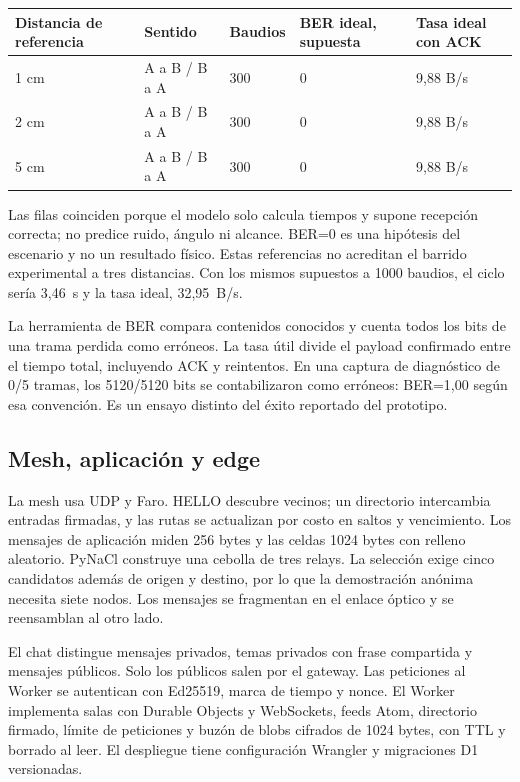 \documentclass[11pt,letterpaper]{article}
\begin{document}
{\small
\begin{tabularx}{\linewidth}{l l l X X}
\toprule
Distancia de referencia & Sentido & Baudios & BER ideal, supuesta & Tasa ideal con ACK\\
\midrule
1 cm & A a B / B a A & 300 & 0 & 9,88 B/s\\
2 cm & A a B / B a A & 300 & 0 & 9,88 B/s\\
5 cm & A a B / B a A & 300 & 0 & 9,88 B/s\\
\bottomrule
\end{tabularx}}

Las filas coinciden porque el modelo solo calcula tiempos y supone recepción
correcta; no predice ruido, ángulo ni alcance. BER=0 es una hipótesis del
escenario y no un resultado físico. Estas referencias no acreditan el barrido
experimental a tres distancias. Con los mismos supuestos a 1000 baudios,
el ciclo sería 3,46~s y la tasa ideal, 32,95~B/s.

La herramienta de BER compara contenidos conocidos y cuenta todos los bits de
una trama perdida como erróneos. La tasa útil divide el payload confirmado entre
el tiempo total, incluyendo ACK y reintentos. En una captura de diagnóstico
de 0/5 tramas, los 5120/5120 bits se contabilizaron como erróneos: BER=1,00 según
esa convención. Es un ensayo distinto del éxito reportado del prototipo.

\subsection{Mesh, aplicación y edge}

La mesh usa UDP y Faro. HELLO descubre vecinos; un directorio intercambia entradas
firmadas, y las rutas se actualizan por costo en saltos y vencimiento. Los mensajes
de aplicación miden 256 bytes y las celdas 1024 bytes con relleno aleatorio.
PyNaCl construye una cebolla de tres relays. La selección exige cinco candidatos
además de origen y destino, por lo que la demostración anónima necesita siete nodos.
Los mensajes se fragmentan en el enlace óptico y se reensamblan al otro lado.

El chat distingue mensajes privados, temas privados con frase compartida y
mensajes públicos. Solo los públicos salen por el gateway. Las peticiones al
Worker se autentican con Ed25519, marca de tiempo y nonce. El Worker implementa
salas con Durable Objects y WebSockets, feeds Atom, directorio firmado, límite
de peticiones y buzón de blobs cifrados de 1024 bytes, con TTL y borrado al leer.
El despliegue tiene configuración Wrangler y migraciones D1 versionadas.
\end{document}
